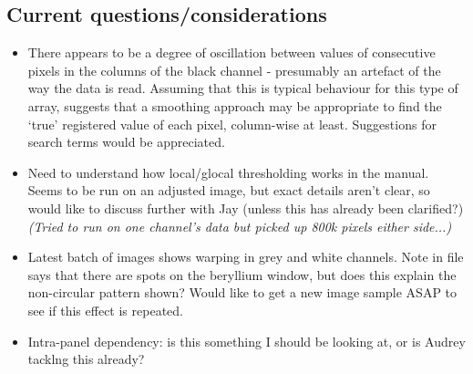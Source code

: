 \documentclass[10pt,fleqn]{article}
\begin{document}
\subsection*{Current questions/considerations}
\begin{itemize}

\item There appears to be a degree of oscillation between values of consecutive pixels in the columns of the black channel - presumably an artefact of the way the data is read. Assuming that this is typical behaviour for this type of array, suggests that a smoothing approach may be appropriate to find the `true' registered value of each pixel, column-wise at least. Suggestions for search terms would be appreciated.

\item Need to understand how local/glocal thresholding works in the manual. Seems to be run on an adjusted image, but exact details aren't clear, so would like to discuss further with Jay (unless this has already been clarified?) \textit{(Tried to run on one channel's data but picked up 800k pixels either side...)}

\item Latest batch of images shows warping in grey and white channels. Note in file says that there are spots on the beryllium window, but does this explain the non-circular pattern shown? Would like to get a new image sample ASAP to see if this effect is repeated.




\item Intra-panel dependency: is this something I should be looking at, or is Audrey tacklng this already?
\end{itemize}
\end{document}
